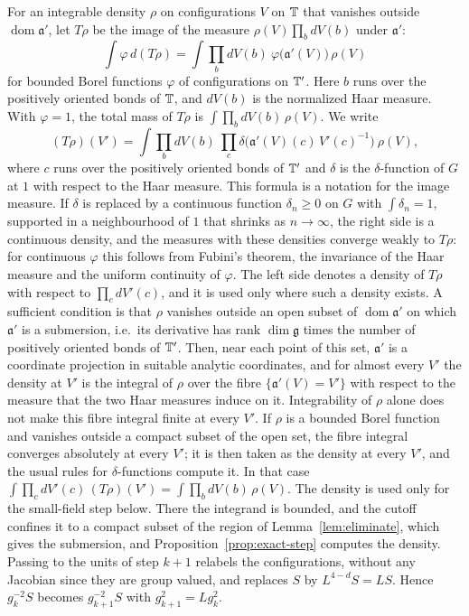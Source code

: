 For an integrable density $\rho$ on configurations $V$ on $\mathbb T$ that vanishes outside $\operatorname{dom}\mathfrak a'$, let $T\rho$ be the image of the measure $\rho(V)\prod_bdV(b)$ under $\mathfrak a'$:
\[
\int\varphi\,d(T\rho)=\int\prod_bdV(b)\ \varphi\big(\mathfrak a'(V)\big)\,\rho(V)
\]
for bounded Borel functions $\varphi$ of configurations on $\mathbb T'$. Here $b$ runs over the positively oriented bonds of $\mathbb T$, and $dV(b)$ is the normalized Haar measure. With $\varphi=1$, the total mass of $T\rho$ is $\int\prod_bdV(b)\,\rho(V)$. We write
\begin{equation}\label{eq:rg-map}
(T\rho)(V')=\int\prod_{b}dV(b)\ \prod_{c}\delta\big(\mathfrak a'(V)(c)\,V'(c)^{-1}\big)\ \rho(V),
\end{equation}
where $c$ runs over the positively oriented bonds of $\mathbb T'$ and $\delta$ is the $\delta$-function of $G$ at $1$ with respect to the Haar measure. This formula is a notation for the image measure. If $\delta$ is replaced by a continuous function $\delta_n\ge0$ on $G$ with $\int\delta_n=1$, supported in a neighbourhood of $1$ that shrinks as $n\to\infty$, the right side is a continuous density, and the measures with these densities converge weakly to $T\rho$: for continuous $\varphi$ this follows from Fubini's theorem, the invariance of the Haar measure and the uniform continuity of $\varphi$. The left side denotes a density of $T\rho$ with respect to $\prod_cdV'(c)$, and it is used only where such a density exists. A sufficient condition is that $\rho$ vanishes outside an open subset of $\operatorname{dom}\mathfrak a'$ on which $\mathfrak a'$ is a submersion, i.e.\ its derivative has rank $\dim\mathfrak g$ times the number of positively oriented bonds of $\mathbb T'$. Then, near each point of this set, $\mathfrak a'$ is a coordinate projection in suitable analytic coordinates, and for almost every $V'$ the density at $V'$ is the integral of $\rho$ over the fibre $\{\mathfrak a'(V)=V'\}$ with respect to the measure that the two Haar measures induce on it. Integrability of $\rho$ alone does not make this fibre integral finite at every $V'$. If $\rho$ is a bounded Borel function and vanishes outside a compact subset of the open set, the fibre integral converges absolutely at every $V'$; it is then taken as the density at every $V'$, and the usual rules for $\delta$-functions compute it. In that case $\int\prod_cdV'(c)\,(T\rho)(V')=\int\prod_bdV(b)\,\rho(V)$. The density is used only for the small-field step below. There the integrand is bounded, and the cutoff confines it to a compact subset of the region of Lemma~\ref{lem:eliminate}, which gives the submersion, and Proposition~\ref{prop:exact-step} computes the density. Passing to the units of step $k+1$ relabels the configurations, without any Jacobian since they are group valued, and replaces $S$ by $L^{4-d}S=LS$. Hence $g_k^{-2}S$ becomes $g_{k+1}^{-2}S$ with $g_{k+1}^2=Lg_k^2$.

